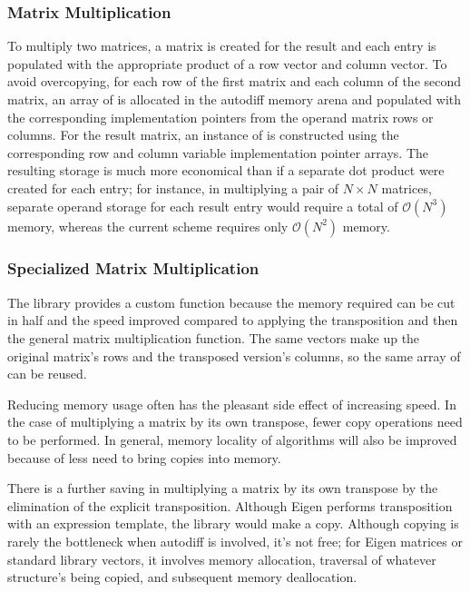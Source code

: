 \documentclass[10pt]{article}
\begin{document}
\subsubsection{Matrix Multiplication}

To multiply two matrices, a matrix is created for the result and each
entry is populated with the appropriate product of a row vector and
column vector.  To avoid overcopying, for each row of the first matrix
and each column of the second matrix, an array of  is
allocated in the autodiff memory arena and populated with the
corresponding implementation pointers from the operand matrix rows or
columns.  For the result matrix, an instance of
 is constructed using the corresponding row
and column variable implementation pointer arrays.  The resulting
storage is much more economical than if a separate dot product were
created for each entry; for instance, in multiplying a pair of $N
\times N$ matrices, separate operand storage for each result entry
would require a total of $\mathcal{O}(N^3)$ memory, whereas the
current scheme requires only $\mathcal{O}(N^2)$ memory.  

\subsubsection{Specialized Matrix Multiplication}

The  library provides a custom
 function because the memory required
can be cut in half and the speed improved compared to applying the
transposition and then the general matrix multiplication function. The
same vectors make up the original matrix's rows and the transposed
version's columns, so the same array of  can be reused.

Reducing memory usage often has the pleasant side effect of increasing
speed.  In the case of multiplying a matrix by its own transpose,
fewer copy operations need to be performed.  In general, memory
locality of algorithms will also be improved because of less need to
bring copies into memory.  

There is a further saving in multiplying a matrix by its own transpose
by the elimination of the explicit transposition.  Although Eigen
performs transposition with an expression template, the
 library would make a copy.  Although copying is
rarely the bottleneck when autodiff is involved, it's not free; for
Eigen matrices or standard library vectors, it involves memory
allocation, traversal of whatever structure's being copied, and
subsequent memory deallocation.
\end{document}
